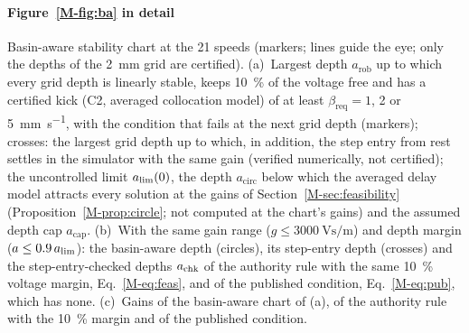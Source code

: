 
\paragraph{Figure~\ref{M-fig:ba} in detail} Basin-aware stability chart at the 21 speeds (markers; lines guide the eye; only the depths of the \SI{2}{\milli\metre} grid are certified). (a)~Largest depth $a_{\mathrm{rob}}$ up to which every grid depth is linearly stable, keeps \SI{10}{\percent} of the voltage free and has a certified kick (C2, averaged collocation model) of at least $\beta_{\mathrm{req}}=1$, 2 or \SI{5}{\milli\metre\per\second}, with the condition that fails at the next grid depth (markers); crosses: the largest grid depth up to which, in addition, the step entry from rest settles in the simulator with the same gain (verified numerically, not certified); the uncontrolled limit $a_{\lim}(0)$, the depth $a_{\mathrm{circ}}$ below which the averaged delay model attracts every solution at the gains of Section~\ref{M-sec:feasibility} (Proposition~\ref{M-prop:circle}; not computed at the chart's gains) and the assumed depth cap $a_{\mathrm{cap}}$. (b)~With the same gain range ($g\le\SI{3000}{\volt\second\per\metre}$) and depth margin ($a\le0.9\,a_{\lim}$): the basin-aware depth (circles), its step-entry depth (crosses) and the step-entry-checked depths $a_{\mathrm{chk}}$ of the authority rule with the same \SI{10}{\percent} voltage margin, Eq.~\eqref{M-eq:feas}, and of the published condition, Eq.~\eqref{M-eq:pub}, which has none. (c)~Gains of the basin-aware chart of (a), of the authority rule with the \SI{10}{\percent} margin and of the published condition.

